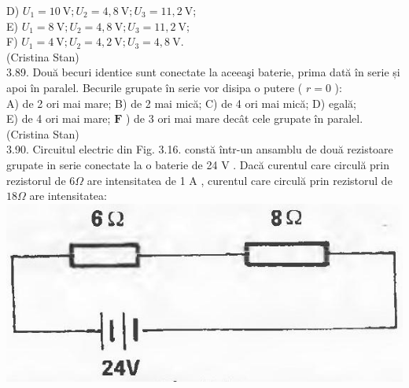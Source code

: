 \documentclass[10pt]{article}
\begin{document}
D) $U_{1}=10 \mathrm{~V} ; U_{2}=4,8 \mathrm{~V} ; U_{3}=11,2 \mathrm{~V}$;\\
E) $U_{1}=8 \mathrm{~V} ; U_{2}=4,8 \mathrm{~V} ; U_{3}=11,2 \mathrm{~V}$;\\
F) $U_{1}=4 \mathrm{~V} ; U_{2}=4,2 \mathrm{~V} ; U_{3}=4,8 \mathrm{~V}$.\\
(Cristina Stan)\\
3.89. Două becuri identice sunt conectate la aceeaşi baterie, prima dată în serie și apoi în paralel. Becurile grupate în serie vor disipa o putere ( $r=0$ ):\\
A) de 2 ori mai mare; B) de 2 mai mică; C) de 4 ori mai mică; D) egală;\\
E) de 4 ori mai mare; $\mathbf{F}$ ) de 3 ori mai mare decât cele grupate în paralel.\\
(Cristina Stan)\\
3.90. Circuitul electric din Fig. 3.16. constă într-un ansamblu de două rezistoare grupate in serie conectate la o baterie de 24 V . Dacă curentul care circulă prin rezistorul de $6 \Omega$ are intensitatea de 1 A , curentul care circulă prin rezistorul de $18 \Omega$ are intensitatea:\\
\includegraphics[max width=\textwidth, center]{2025_07_01_5b3ff9fa0d508c8e9f17g-163}
\end{document}
